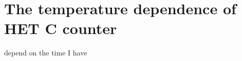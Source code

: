 \chapter{The temperature dependence of HET C counter}
\label{chp:HET_temperature_dependence}

depend on the time I have